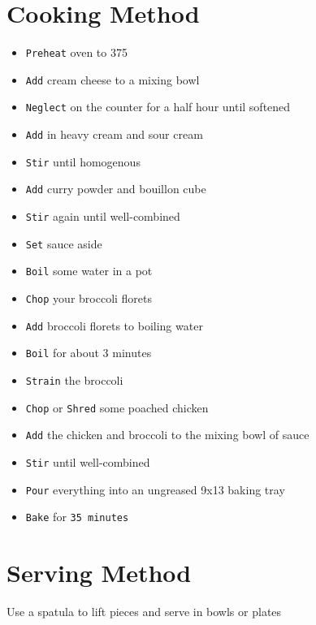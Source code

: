 \documentclass{article}
\let\US\SI
\begin{document}
\begin{multicols}{2}
\section{Cooking Method}
\begin{itemize}
	\item \verb|Preheat| oven to \US{375}{\fahrenheit}	
	\item \verb|Add| cream cheese to a mixing bowl
	\item \verb|Neglect| on the counter for a half hour until softened
	\item \verb|Add| in heavy cream and sour cream
	\item \verb|Stir| until homogenous
	\item \verb|Add| curry powder\cite{CURRYPOWDER} and bouillon cube
	\item \verb|Stir| again until well-combined
	\item \verb|Set| sauce aside
	\item \verb|Boil| some water in a pot
	\item \verb|Chop| your broccoli florets
	\item \verb|Add| broccoli florets to boiling water
	\item \verb|Boil| for about 3 minutes
	\item \verb|Strain| the broccoli
	\item \verb|Chop| or \verb|Shred| some poached chicken\cite{CHICKEN}
	\item \verb|Add| the chicken and broccoli to the mixing bowl of sauce
	\item \verb|Stir| until well-combined
	\item \verb|Pour| everything into an ungreased 9x13 baking tray
	\item \verb|Bake| for \verb|35 minutes|
\end{itemize}

\section{Serving Method}
Use a spatula to lift pieces and serve in bowls or plates



\end{multicols}
\end{document}
